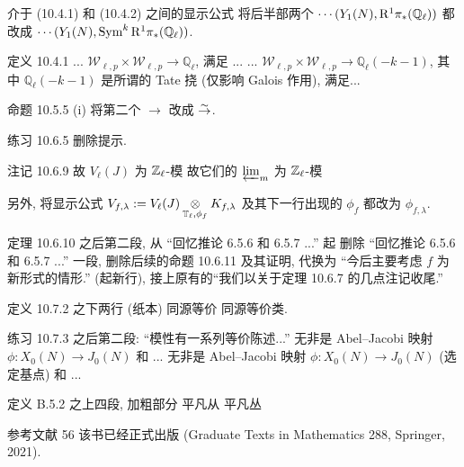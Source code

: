 \documentclass{AJerrata}
\begin{document}
\begin{Errata}
		\item[介于 (10.4.1) 和 (10.4.2) 之间的显示公式]
		将后半部两个 $\cdots(Y_1(N), \mathrm{R}^1 \pi_*(\mathbb{Q}_\ell))$ 都改成 $\cdots(Y_1(N), \operatorname{Sym}^k \mathrm{R}^1 \pi_*(\mathbb{Q}_\ell))$.

		\item[定义 10.4.1]
		\Orig ... $\mathcal{W}_{\ell, p} \times \mathcal{W}_{\ell, p} \to \mathbb{Q}_\ell$, 满足 ...
		\Corr ... $\mathcal{W}_{\ell, p} \times \mathcal{W}_{\ell, p} \to \mathbb{Q}_\ell(-k-1)$, 其中 $\mathbb{Q}_\ell(-k-1)$ 是所谓的 Tate 挠 (仅影响 Galois 作用), 满足...
		
		\item[命题 10.5.5 (i)]
		将第二个 $\to$ 改成 $\stackrel{\sim}{\rightarrow}$.
		
		\item[练习 10.6.5]
		删除提示.
		
		\item[注记 10.6.9]
		\Orig 故 $V_\ell(J)$ 为 $\mathbb{Z}_\ell$-模
		\Corr 故它们的 $\varprojlim_m$ 为 $\mathbb{Z}_\ell$-模
		
		另外, 将显示公式 $V_{f, \lambda} := V_\ell(J) \underset{\mathbb{T}_\ell, \phi_f}{\otimes} K_{f, \lambda}$ 及其下一行出现的 $\phi_f$ 都改为 $\phi_{f, \lambda}$.
		
		\item[定理 10.6.10 之后第二段, 从 ``回忆推论 6.5.6 和 6.5.7 ...'' 起]
		删除 ``回忆推论 6.5.6 和 6.5.7 ...'' 一段, 删除后续的命题 10.6.11 及其证明, 代换为 ``今后主要考虑 $f$ 为新形式的情形.'' (起新行), 接上原有的``我们以关于定理 10.6.7 的几点注记收尾.''
		
		\item[定义 10.7.2 之下两行 (纸本)]
		\Orig 同源等价
		\Corr 同源等价类.
		
		\item[练习 10.7.3 之后第二段: ``模性有一系列等价陈述...'']
		\Orig 无非是 Abel--Jacobi 映射 $\phi: X_0(N) \to J_0(N)$ 和 ...
		\Corr 无非是 Abel--Jacobi 映射 $\phi: X_0(N) \to J_0(N)$ (选定基点) 和 ...
		
		\item[定义 B.5.2 之上四段, 加粗部分]
		\Orig 平凡从
		\Corr 平凡丛
		
		\item[参考文献 56] 该书已经正式出版 (Graduate Texts in Mathematics 288, Springer, 2021).
	\end{Errata}
\end{document}
